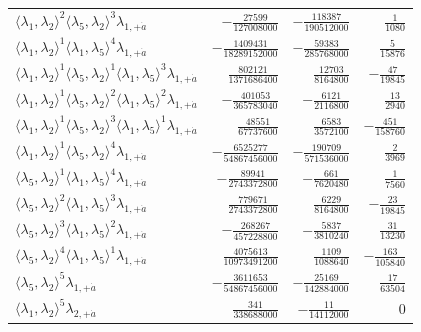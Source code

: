 \begin{longtable}{@{}lrrr@{}}
$\langle\lambda_1,\lambda_2\rangle^{2}\langle\lambda_5,\lambda_2\rangle^{3}\lambda_{1,+\dot a}$ & $-\frac{27599}{127008000}$ & $-\frac{118387}{190512000}$ & $\frac{1}{1080}$ \\
$\langle\lambda_1,\lambda_2\rangle^{1}\langle\lambda_1,\lambda_5\rangle^{4}\lambda_{1,+\dot a}$ & $-\frac{1409431}{18289152000}$ & $-\frac{59383}{285768000}$ & $\frac{5}{15876}$ \\
$\langle\lambda_1,\lambda_2\rangle^{1}\langle\lambda_5,\lambda_2\rangle^{1}\langle\lambda_1,\lambda_5\rangle^{3}\lambda_{1,+\dot a}$ & $\frac{802121}{1371686400}$ & $\frac{12703}{8164800}$ & $-\frac{47}{19845}$ \\
$\langle\lambda_1,\lambda_2\rangle^{1}\langle\lambda_5,\lambda_2\rangle^{2}\langle\lambda_1,\lambda_5\rangle^{2}\lambda_{1,+\dot a}$ & $-\frac{401053}{365783040}$ & $-\frac{6121}{2116800}$ & $\frac{13}{2940}$ \\
$\langle\lambda_1,\lambda_2\rangle^{1}\langle\lambda_5,\lambda_2\rangle^{3}\langle\lambda_1,\lambda_5\rangle^{1}\lambda_{1,+\dot a}$ & $\frac{48551}{67737600}$ & $\frac{6583}{3572100}$ & $-\frac{451}{158760}$ \\
$\langle\lambda_1,\lambda_2\rangle^{1}\langle\lambda_5,\lambda_2\rangle^{4}\lambda_{1,+\dot a}$ & $-\frac{6525277}{54867456000}$ & $-\frac{190709}{571536000}$ & $\frac{2}{3969}$ \\
$\langle\lambda_5,\lambda_2\rangle^{1}\langle\lambda_1,\lambda_5\rangle^{4}\lambda_{1,+\dot a}$ & $-\frac{89941}{2743372800}$ & $-\frac{661}{7620480}$ & $\frac{1}{7560}$ \\
$\langle\lambda_5,\lambda_2\rangle^{2}\langle\lambda_1,\lambda_5\rangle^{3}\lambda_{1,+\dot a}$ & $\frac{779671}{2743372800}$ & $\frac{6229}{8164800}$ & $-\frac{23}{19845}$ \\
$\langle\lambda_5,\lambda_2\rangle^{3}\langle\lambda_1,\lambda_5\rangle^{2}\lambda_{1,+\dot a}$ & $-\frac{268267}{457228800}$ & $-\frac{5837}{3810240}$ & $\frac{31}{13230}$ \\
$\langle\lambda_5,\lambda_2\rangle^{4}\langle\lambda_1,\lambda_5\rangle^{1}\lambda_{1,+\dot a}$ & $\frac{4075613}{10973491200}$ & $\frac{1109}{1088640}$ & $-\frac{163}{105840}$ \\
$\langle\lambda_5,\lambda_2\rangle^{5}\lambda_{1,+\dot a}$ & $-\frac{3611653}{54867456000}$ & $-\frac{25169}{142884000}$ & $\frac{17}{63504}$ \\
$\langle\lambda_1,\lambda_2\rangle^{5}\lambda_{2,+\dot a}$ & $\frac{341}{338688000}$ & $-\frac{11}{14112000}$ & $0$ \\

\end{longtable}
